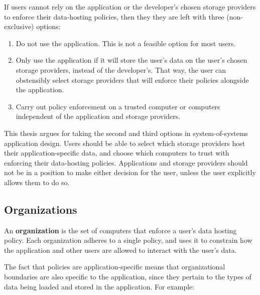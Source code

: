 If users cannot rely on the application or the developer's chosen storage providers
to enforce their data-hosting policies, then they they are left with three
(non-exclusive) options:

\begin{enumerate}
   \item Do not use the application.  This is not a feasible option for
      most users.
   \item Only use the application if it will store the user's data on the user's
      chosen storage providers, instead of the developer's.  That
      way, the user can obstensibly select storage providers that will enforce 
      their policies alongside the application.
   \item Carry out policy enforcement on a trusted computer or computers
      independent of the application and storage providers.
\end{enumerate}

This thesis argues for taking the second and third options in system-of-systems
application design.  Users should be able to select which storage providers
host their application-specific data, and choose which computers to trust
with enforcing their data-hosting policies.
Applications and storage providers should not be in a position to make either
decision for the user, unless the user explicitly allows them to do so.

\subsection{Organizations}

An \textbf{organization} is the set of computers that enforce a user's
data hosting policy.  Each organization adheres to a single
policy, and uses it to constrain how the application and other users are allowed to
interact with the user's data.

The fact that policies are application-specific means that organizational boundaries
are also specific to the application, since they pertain to the types of data being loaded
and stored in the application.  For example:

